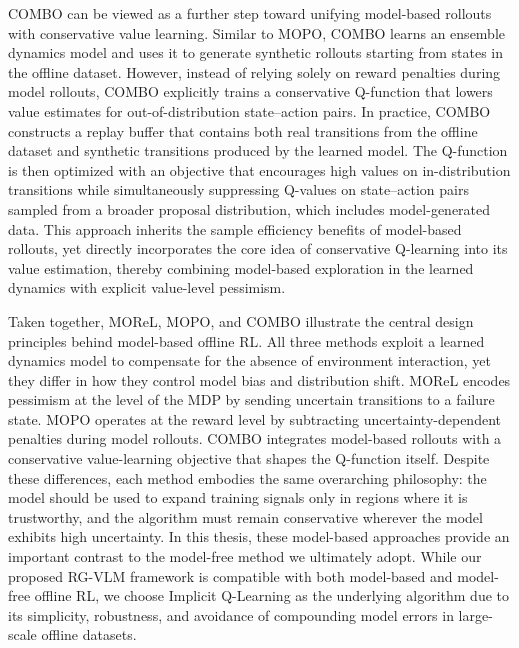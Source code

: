 \documentclass[master,english,final]{kaist-ucs}
\begin{document}
COMBO\cite{yu2021combo} can be viewed as a further step toward unifying model-based rollouts with conservative value learning. Similar to MOPO\cite{yu2020mopo}, COMBO\cite{yu2021combo} learns an ensemble dynamics model and uses it to generate synthetic rollouts starting from states in the offline dataset. However, instead of relying solely on reward penalties during model rollouts, COMBO\cite{yu2021combo} explicitly trains a conservative Q-function that lowers value estimates for out-of-distribution state–action pairs. In practice, COMBO\cite{yu2021combo} constructs a replay buffer that contains both real transitions from the offline dataset and synthetic transitions produced by the learned model. The Q-function is then optimized with an objective that encourages high values on in-distribution transitions while simultaneously suppressing Q-values on state–action pairs sampled from a broader proposal distribution, which includes model-generated data. This approach inherits the sample efficiency benefits of model-based rollouts, yet directly incorporates the core idea of conservative Q-learning into its value estimation, thereby combining model-based exploration in the learned dynamics with explicit value-level pessimism.

Taken together, MOReL\cite{kidambi2020morel}, MOPO\cite{yu2020mopo}, and COMBO\cite{yu2021combo} illustrate the central design principles behind model-based offline RL. All three methods exploit a learned dynamics model to compensate for the absence of environment interaction, yet they differ in how they control model bias and distribution shift. MOReL\cite{kidambi2020morel} encodes pessimism at the level of the MDP by sending uncertain transitions to a failure state. MOPO\cite{yu2020mopo} operates at the reward level by subtracting uncertainty-dependent penalties during model rollouts. COMBO\cite{yu2021combo} integrates model-based rollouts with a conservative value-learning objective that shapes the Q-function itself. Despite these differences, each method embodies the same overarching philosophy: the model should be used to expand training signals only in regions where it is trustworthy, and the algorithm must remain conservative wherever the model exhibits high uncertainty. In this thesis, these model-based approaches provide an important contrast to the model-free method we ultimately adopt. While our proposed RG-VLM framework is compatible with both model-based and model-free offline RL, we choose Implicit Q-Learning as the underlying algorithm due to its simplicity, robustness, and avoidance of compounding model errors in large-scale offline datasets.
\end{document}
